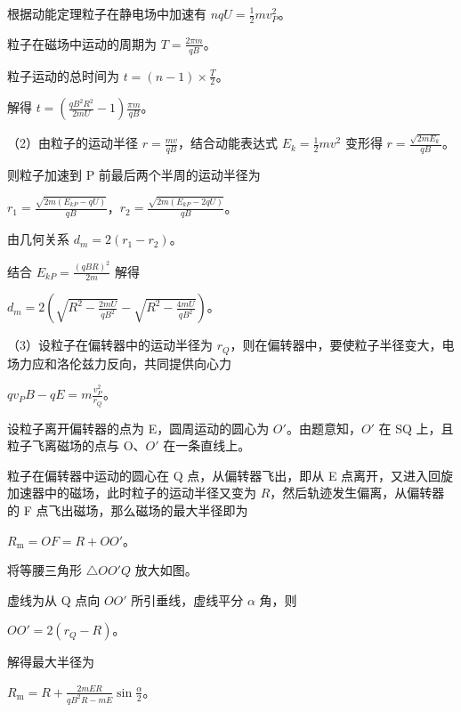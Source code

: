 \documentclass[\gkver]{gaokaozhenti}
\begin{document}
\begin{enumerate}
{根据动能定理粒子在静电场中加速有 $nqU=\frac{1}{2}mv_{P}^{2}$。

粒子在磁场中运动的周期为 $T=\frac{2\pi m}{qB}$。

粒子运动的总时间为 $t=(n-1)\times\frac{T}{2}$。

解得 $t=\left(\frac{qB^{2}R^{2}}{2mU}-1\right)\frac{\pi m}{qB}$。

（2）由粒子的运动半径 $r = \frac{mv}{qB}$，结合动能表达式 $E_{k} = \frac{1}{2}mv^{2}$ 变形得 $r = \frac{\sqrt{2mE_{k}}}{qB}$。

则粒子加速到 P 前最后两个半周的运动半径为

$r_{1}=\frac{\sqrt{2m(E_{kP}-qU)}}{qB}$，$r_{2}=\frac{\sqrt{2m(E_{kP}-2qU)}}{qB}$。

由几何关系 $d_{m}=2(r_{1}-r_{2})$。

结合 $E_{kP}=\frac{(qBR)^{2}}{2m}$ 解得

$d_{m}=2\left(\sqrt{R^{2}-\frac{2mU}{qB^{2}}}-\sqrt{R^{2}-\frac{4mU}{qB^{2}}}\right)$。

（3）设粒子在偏转器中的运动半径为 $r_{Q}$，则在偏转器中，要使粒子半径变大，电场力应和洛伦兹力反向，共同提供向心力

$qv_{P}B - qE = m\frac{v_{P}^{2}}{r_{Q}}$。

设粒子离开偏转器的点为 E，圆周运动的圆心为 $O'$。由题意知，$O'$ 在 SQ 上，且粒子飞离磁场的点与 O、$O'$ 在一条直线上。


粒子在偏转器中运动的圆心在 Q 点，从偏转器飞出，即从 E 点离开，又进入回旋加速器中的磁场，此时粒子的运动半径又变为 $R$，然后轨迹发生偏离，从偏转器的 F 点飞出磁场，那么磁场的最大半径即为

$R_{\mathrm{m}}=OF=R+OO'$。

将等腰三角形 $\triangle OO'Q$ 放大如图。


虚线为从 Q 点向 $OO'$ 所引垂线，虚线平分 $\alpha$ 角，则

$OO'=2(r_{Q}-R)$。

解得最大半径为

$R_{\mathrm{m}}=R+\frac{2mER}{qB^{2}R-mE}\sin\frac{\alpha}{2}$。
}

\end{enumerate}
\end{document}
